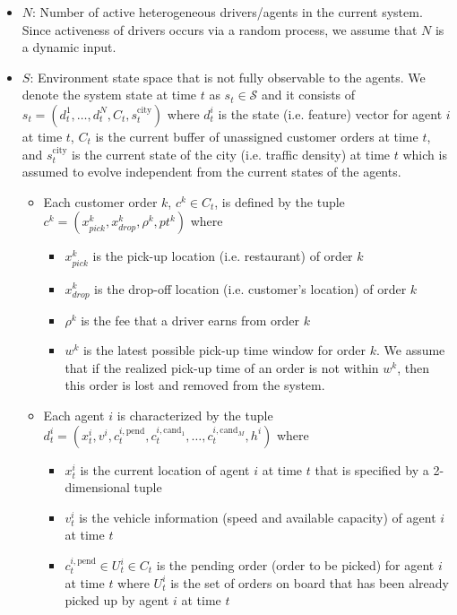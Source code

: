 \documentclass{article}
\theoremstyle{defn}
\theoremstyle{prop}
\theoremstyle{assm}
\theoremstyle{theoremm}
\theoremstyle{remarkk}
\theoremstyle{lem}
\theoremstyle{example}
\theoremstyle{example}
\begin{document}
\begin{itemize}[leftmargin=*]
    \item $N$: Number of active heterogeneous drivers/agents in the current system. Since activeness of drivers occurs via a random process, we assume that $N$ is a dynamic input.
    \item $S$: Environment state space that is not fully observable to the agents. We denote the system state at time $t$ as $s_t \in \mathcal{S}$ and it consists of $s_t = (d^1_t, 
    \ldots, d^N_t, C_t, s_t^{\text{city}})$ where $d^i_t$ is the state (i.e. feature) vector for agent $i$ at time $t$, $C_t$ is the current buffer of unassigned customer orders at time $t$, and $s_t^{\text{city}}$ is the current state of the city (i.e. traffic density) at time $t$ which is assumed to evolve independent from the current states of the agents. 
    \begin{itemize} 
        \item Each customer order $k$, $c^k \in C_t$, is defined by the tuple $c^k = (x^k_{pick}, x^k_{drop}, \rho^k, pt^k)$ where 
        \begin{itemize}
            \item $x^k_{pick}$ is the pick-up location (i.e. restaurant) of order $k$
            \item $x^k_{drop}$ is the drop-off location (i.e. customer's location) of order $k$
            \item $\rho^k$ is the fee that a driver earns from order $k$
            \item $w^k$ is the latest possible pick-up time window for order $k$. We assume that if the realized pick-up time of an order is not within $w^k$, then this order is lost and removed from the system. 
        \end{itemize}
        \item Each agent $i$ is characterized by the tuple $d^i_t = (x_t^i, v^i, c_t^{i,\text{pend}},c_t^{i,\text{cand}_1}, \ldots, c_t^{i,\text{cand}_M}, h^i)$ where 
        \begin{itemize}
            \item $x_t^i$ is the current location of agent $i$ at time $t$ that is specified by a 2-dimensional tuple
            \item $v_t^i$ is the vehicle information (speed and available capacity) of agent $i$ at time $t$
            \item $c_t^{i,\text{pend}} \in U_t^i \in C_t$ is the pending order (order to be picked) for agent $i$ at time $t$ where $U_t^i$ is the set of orders on board that has been already picked up by agent $i$ at time $t$

\end{itemize}
\end{itemize}
\end{itemize}
\end{document}
